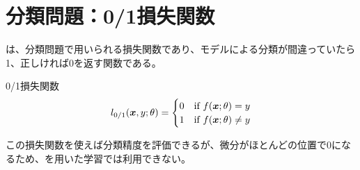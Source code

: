 \documentclass[../../../topic_machine-learning]{subfiles}
\begin{document}
\sectionline
\section{分類問題：0/1損失関数}

は、分類問題で用いられる損失関数であり、モデルによる分類が間違っていたら1、正しければ0を返す関数である。

\begin{definition}{0/1損失関数}
  \begin{equation*}
    l_{0/1}(\vb*{x}, y; \theta) = \begin{cases}
      0 & \text{if } f(\vb*{x}; \theta) = y \\
      1 & \text{if } f(\vb*{x}; \theta) \neq y
    \end{cases}
  \end{equation*}
\end{definition}

この損失関数を使えば分類精度を評価できるが、微分がほとんどの位置で0になるため、を用いた学習では利用できない。
\end{document}

